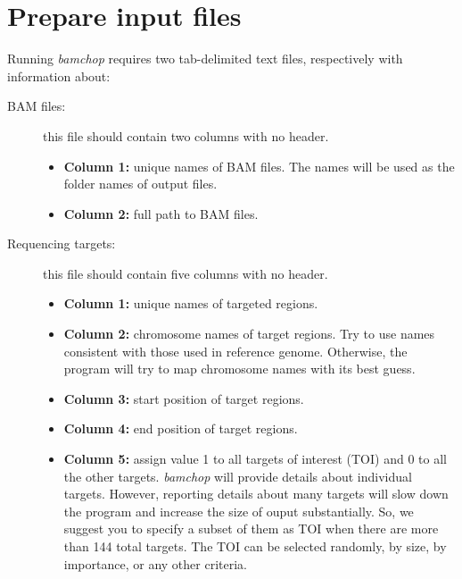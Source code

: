 \documentclass{article}
\begin{document}
\section{Prepare input files}
Running \textit{bamchop} requires two tab-delimited text files, respectively with information about:
\begin{description}
\item[BAM files:] this file should contain two columns with no header.
\begin{itemize}
  \item \textbf{Column 1: } unique names of BAM files. The names will be used as the folder names of output files.
  \item \textbf{Column 2: } full path to BAM files.
  \end{itemize}
\item[Requencing targets:] this file should contain five columns with no header. 
\begin{itemize}
  \item \textbf{Column 1: } unique names of targeted regions.
  \item \textbf{Column 2: } chromosome names of target regions. Try to use names consistent with those used in reference genome. Otherwise, the program will try to map chromosome names with its best guess.
  \item \textbf{Column 3: } start position of target regions.
  \item \textbf{Column 4: } end position of target regions.
  \item \textbf{Column 5: } assign value 1 to all targets of interest (TOI) and 0 to all the other targets. \textit{bamchop} will provide details about individual targets. However, reporting details about many targets will slow down the program and increase the size of ouput substantially. So, we suggest you to specify a subset of them as TOI when there are more than 144 total targets. The TOI can be selected randomly, by size, by importance, or any other criteria. 
  \end{itemize}
\end{description}
\end{document}

